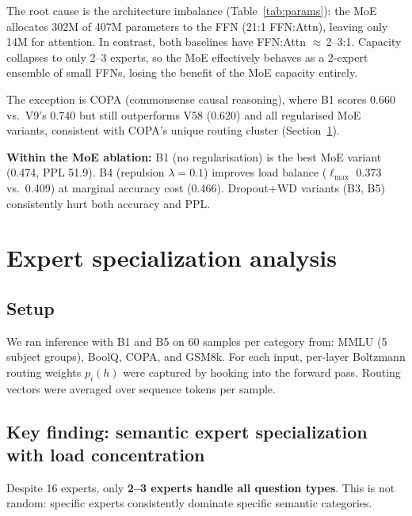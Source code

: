 \documentclass[11pt,a4paper]{article}
\begin{document}
The root cause is the architecture imbalance (Table~\ref{tab:params}):
the MoE allocates 302M of 407M parameters to the FFN (21:1 FFN:Attn),
leaving only 14M for attention.  In contrast, both baselines have FFN:Attn
$\approx$\,2--3:1.  Capacity collapses to only 2--3 experts, so the MoE
effectively behaves as a 2-expert ensemble of small FFNs, losing the benefit
of the MoE capacity entirely.

The exception is COPA (commonsense causal reasoning), where B1 scores 0.660
vs.\ V9's 0.740 but still outperforms V58 (0.620) and all regularised MoE
variants, consistent with COPA's unique routing cluster (Section~\ref{sec:spec}).

\noindent\textbf{Within the MoE ablation:}
B1 (no regularisation) is the best MoE variant (0.474, PPL 51.9).
B4 (repulsion $\lambda{=}0.1$) improves load balance ($\ell_\text{max}$ 0.373
vs.\ 0.409) at marginal accuracy cost (0.466).
Dropout+WD variants (B3, B5) consistently hurt both accuracy and PPL.

\section{Expert specialization analysis}
\label{sec:spec}

\subsection{Setup}
We ran inference with B1 and B5 on 60 samples per category from:
MMLU (5 subject groups), BoolQ, COPA, and GSM8k.
For each input, per-layer Boltzmann routing weights $p_i(h)$ were captured
by hooking into the forward pass.  Routing vectors were averaged over sequence
tokens per sample.

\subsection{Key finding: semantic expert specialization with load concentration}

Despite 16 experts, only \textbf{2--3 experts handle all question types}.
This is not random: specific experts consistently dominate specific semantic categories.
\end{document}
